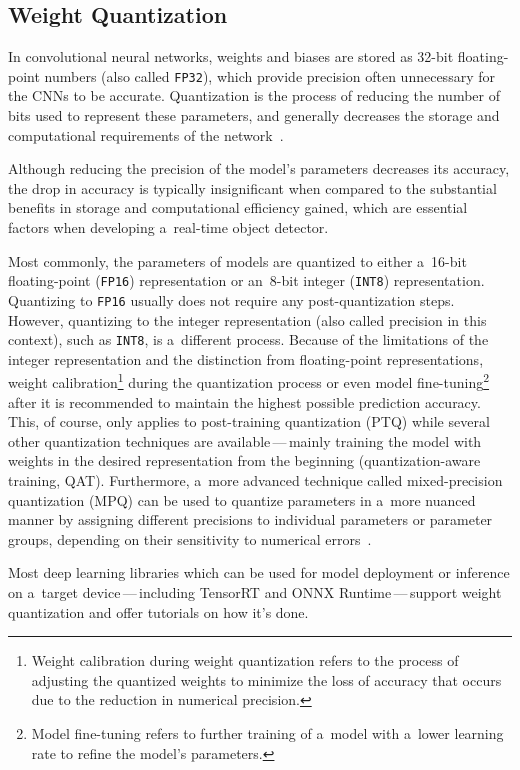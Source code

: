 \subsection{Weight Quantization}

In convolutional neural networks, weights and biases are stored as 32-bit
floating-point numbers (also called \texttt{FP32}), which provide precision often
unnecessary for the CNNs to be accurate. Quantization is the process of reducing
the number of bits used to represent these parameters, and generally decreases
the storage and computational requirements of the network~\cite{Choudhary2020}.

Although reducing the precision of the model's parameters decreases its
accuracy, the drop in accuracy is typically insignificant when compared to the
substantial benefits in storage and computational efficiency gained, which are
essential factors when developing a~real-time object detector.

Most commonly, the parameters of models are quantized to either a~16-bit
floating-point (\texttt{FP16}) representation or an~8-bit integer
(\texttt{INT8}) representation. Quantizing to \texttt{FP16} usually does not
require any post-quantization steps. However, quantizing to the integer
representation (also called precision in this context), such as \texttt{INT8},
is a~different process. Because of the limitations of the integer representation
and the distinction from floating-point representations, weight
calibration\footnote{Weight calibration during weight quantization refers to the
process of adjusting the quantized weights to minimize the loss of accuracy that
occurs due to the reduction in numerical precision.} during the quantization
process or even model fine-tuning\footnote{Model fine-tuning refers to further
training of a~model with a~lower learning rate to refine the model's parameters.}
after it is recommended to maintain the highest possible prediction accuracy.
This, of course, only applies to post-training quantization (PTQ) while several
other quantization techniques are available\,---\,mainly training the model with
weights in the desired representation from the beginning (quantization-aware
training, QAT). Furthermore, a~more advanced technique called
mixed-precision quantization (MPQ) can be used to quantize parameters in a~more
nuanced manner by assigning different precisions to individual parameters or
parameter groups, depending on their sensitivity to numerical
errors~\cite{Tang2022}.

Most deep learning libraries which can be used for model deployment or inference
on a~target device\,---\,including TensorRT and ONNX Runtime\,---\,support
weight quantization and offer tutorials on how it's done.


